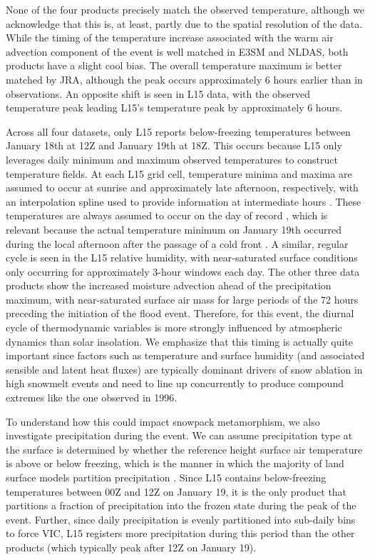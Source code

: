 \documentclass[nhess, manuscript]{copernicus}
\begin{document}
None of the four products precisely match the observed temperature, although we acknowledge that this is, at least, partly due to the spatial resolution of the data.
While the timing of the temperature increase associated with the warm air advection component of the event is well matched in E3SM and NLDAS, both products have a slight cool bias.
The overall temperature maximum is better matched by JRA, although the peak occurs approximately 6 hours earlier than in observations. An opposite shift is seen in L15 data, with the observed temperature peak leading L15's temperature peak by approximately 6 hours.

Across all four datasets, only L15 reports below-freezing temperatures between January 18th at 12Z and January 19th at 18Z.
This occurs because L15 only leverages daily minimum and maximum observed temperatures to construct temperature fields.
At each L15 grid cell, temperature minima and maxima are assumed to occur at sunrise and approximately late afternoon, respectively, with an interpolation spline used to provide information at intermediate hours \citep{bohn2013global}.
These temperatures are always assumed to occur on the day of record \citep{livneh2015spatially}, which is relevant because the actual temperature minimum on January 19th occurred during the local afternoon after the passage of a cold front \citep{leathers1998severe}.
A similar, regular cycle is seen in the L15 relative humidity, with near-saturated surface conditions only occurring for approximately 3-hour windows each day. The other three data products show the increased moisture advection ahead of the precipitation maximum, with near-saturated surface air mass for large periods of the 72 hours preceding the initiation of the flood event.
Therefore, for this event, the diurnal cycle of thermodynamic variables is more strongly influenced by atmospheric dynamics than solar insolation.
We emphasize that this timing is actually quite important since factors such as temperature and surface humidity (and associated sensible and latent heat fluxes) are typically dominant drivers of snow ablation in high snowmelt events \citep{mazurkiewicz2008assessing,wurzer2016influence,harpold2018humidity} and need to line up concurrently to produce compound extremes like the one observed in 1996.

To understand how this could impact snowpack metamorphism, we also investigate precipitation during the event.
We can assume precipitation type at the surface is determined by whether the reference height surface air temperature is above or below freezing, which is the manner in which the majority of land surface models partition precipitation \citep{harpold2017rain,jennings2018spatial,Woodburn2021}.
Since L15 contains below-freezing temperatures between 00Z and 12Z on January 19, it is the only product that partitions a fraction of precipitation into the frozen state during the peak of the event.
Further, since daily precipitation is evenly partitioned into sub-daily bins to force VIC, L15 registers more precipitation during this period than the other products (which typically peak after 12Z on January 19).
\end{document}
